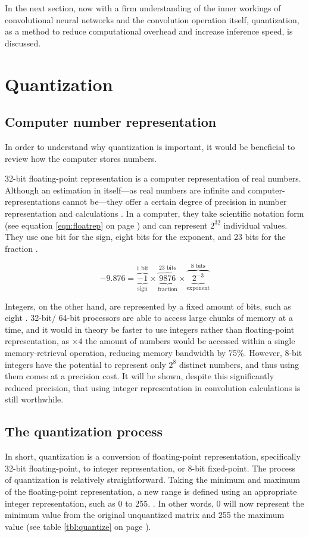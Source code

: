 In the next section, now with a firm understanding of the inner workings of convolutional neural networks and the convolution operation itself, quantization, as a method to reduce computational overhead and increase inference speed, is discussed.

\section{Quantization}
\subsection{Computer number representation}
In order to understand why quantization is important, it would be beneficial to review how the computer stores numbers.

32-bit floating-point representation is a computer representation of real numbers. Although an estimation in itself---as real numbers are infinite and computer-representations cannot be---they offer a certain degree of precision in number representation and calculations \cite{ieee}. In a computer, they take scientific notation form (see equation \ref{eqn:floatrep} on page \pageref{eqn:floatrep}) and can represent $2^{32}$ individual values. They use one bit for the sign, eight bits for the exponent, and 23 bits for the fraction \cite{ieee}.

\begin{equation}
\label{eqn:floatrep}
-9.876 = \overbrace{\underbrace{-1}_\text{sign}}^\text{1 bit}\times\overbrace{\underbrace{9876}_\text{fraction}}^\text{23 bits}\times\overbrace{\underbrace{2^{-3}}_\text{exponent}}^\text{8 bits}
\end{equation}

Integers, on the other hand, are represented by a fixed amount of bits, such as eight \cite{ieee}. 32-bit/ 64-bit processors are able to access large chunks of memory at a time, and it would in theory be faster to use integers rather than floating-point representation, as $\times4$ the amount of numbers would be accessed within a single memory-retrieval operation, reducing memory bandwidth by 75\%. However, 8-bit integers have the potential to represent only $2^{8}$ distinct numbers, and thus using them comes at a precision cost. It will be shown, despite this significantly reduced precision, that using integer representation in convolution calculations is still worthwhile.

\subsection{The quantization process}
In short, quantization is a conversion of floating-point representation, specifically 32-bit floating-point, to integer representation, or 8-bit fixed-point. The process of quantization is relatively straightforward. Taking the minimum and maximum of the floating-point representation, a new range is defined using an appropriate integer representation, such as 0 to 255. \cite{warden_quantize}. In other words, 0 will now represent the minimum value from the original unquantized matrix and 255 the maximum value (see table \ref{tbl:quantize} on page \pageref{tbl:quantize}).


